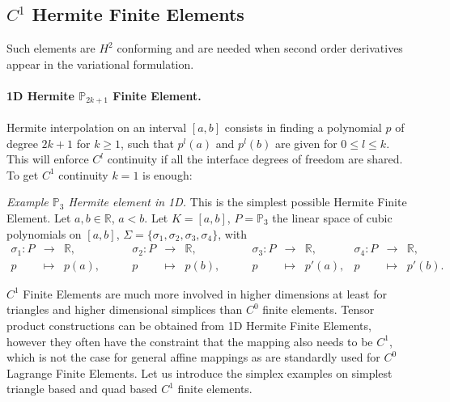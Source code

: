 \subsection{$C^1$ Hermite Finite Elements}

Such elements are $H^2$ conforming and are needed when second order derivatives appear in the variational formulation. 

\paragraph{1D Hermite $ \mathbb{P}_{2k+1}$ Finite Element.} Hermite interpolation on an interval $[a,b]$ consists in finding a polynomial $p$ of degree $2k+1$ for $k \geq 1$, such that $p^{l}(a)$ and $p^l(b)$ are given for $0\leq l\leq k$. This will enforce $C^l$ continuity if all the interface degrees of freedom are shared.
To get $C^1$ continuity $k=1$ is enough:

\textit{Example $\mathbb{P}_3$ Hermite element in 1D.} This is the simplest possible Hermite Finite Element. 
Let $a,b\in \mathbb{R}$, $a<b$. Let $K=[a,b]$, 
$P= \mathbb{P}_3$ the linear space of cubic polynomials on $[a,b]$, $\Sigma=\{\sigma_1,
\sigma_2,\sigma_3, \sigma_4\}$, with
$$
\begin{array}{rcl}
\sigma_1:P&\rightarrow & \mathbb{R},\\
p&\mapsto &p(a),
\end{array}\qquad
\begin{array}{rcl}
\sigma_2:P&\rightarrow & \mathbb{R},\\
p&\mapsto &p(b),
\end{array}\qquad
\begin{array}{rcl}
\sigma_3:P&\rightarrow & \mathbb{R},\\
p&\mapsto &p'(a),
\end{array}
\begin{array}{rcl}
\sigma_4:P&\rightarrow & \mathbb{R},\\
p&\mapsto &p'(b).
\end{array}
$$

$C^1$ Finite Elements  are much more involved in higher dimensions at least for triangles and higher dimensional simplices than $C^0$ finite elements.  Tensor product constructions can be obtained from 1D Hermite Finite Elements, however they often have the constraint that the mapping also needs to be $C^1$, which is not the case for general affine mappings as are standardly used for $C^0$ Lagrange Finite Elements. Let us introduce the simplex examples on simplest triangle based and quad based $C^1$ finite elements.

